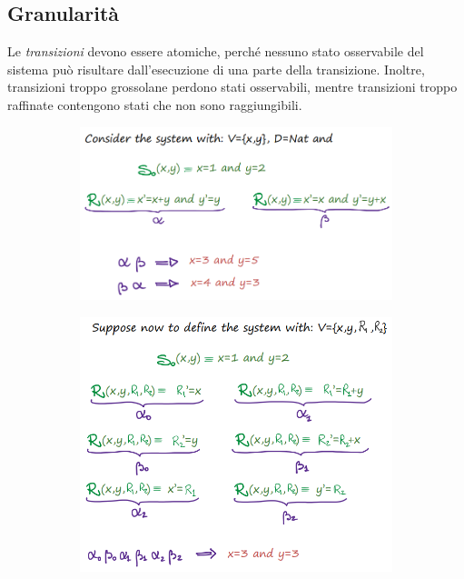 \documentclass[a4paper,oneside,titlepage]{book}
\begin{document}
\subsection{Granularità}
Le \textit{transizioni} devono essere atomiche, perché nessuno stato osservabile del sistema può risultare dall'esecuzione di una parte della transizione. Inoltre, transizioni troppo grossolane perdono stati osservabili, mentre transizioni troppo raffinate contengono stati che non sono raggiungibili.
\begin{figure}[htp]
	\begin{subfigure}{0.49\textwidth}
	    \centering
		\includegraphics[width=\textwidth, height=\textheight, keepaspectratio]{kripke4.png}
	\end{subfigure}
	\hfill
	\begin{subfigure}{0.49\textwidth}
	    \centering
		\includegraphics[width=\textwidth, height=\textheight, keepaspectratio]{kripke5.png}
	\end{subfigure}
\end{figure}
\end{document}
